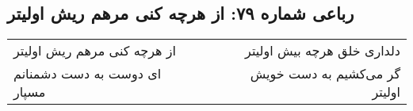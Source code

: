 \begin{center}
\section*{رباعی شماره ۷۹: از هرچه کنی مرهم ریش اولیتر}
\label{sec:079}
\begin{longtable}{l p{0.5cm} r}
از هرچه کنی مرهم ریش اولیتر
&&
دلداری خلق هرچه بیش اولیتر
\\
ای دوست به دست دشمنانم مسپار
&&
گر می‌کشیم به دست خویش اولیتر
\\
\end{longtable}
\end{center}
